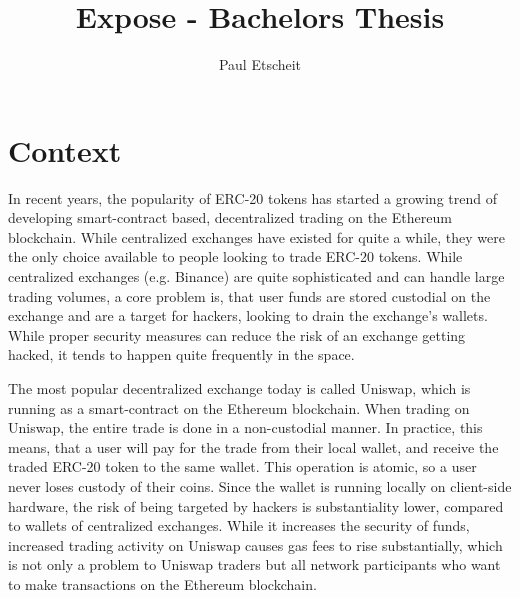 \documentclass[runningheads]{llncs}
\begin{document}
%
\title{Expose - Bachelors Thesis}
%
%
\author{Paul Etscheit}
%
%
%
\maketitle              %

\section{Context}
In recent years, the popularity of ERC-20 tokens has started a growing trend of developing smart-contract based, decentralized trading on the Ethereum blockchain. While centralized exchanges have existed for quite a while, they were the only choice available to people looking to trade ERC-20 tokens. While centralized exchanges (e.g. Binance) are quite sophisticated and can handle large trading volumes, a core problem is, that user funds are stored custodial on the exchange and are a target for hackers, looking to drain the exchange's wallets. While proper security measures can reduce the risk of an exchange getting hacked, it tends to happen quite frequently in the space. 

The most popular decentralized exchange today is called Uniswap\cite{adams2020uniswap}, which is running as a smart-contract on the Ethereum blockchain. When trading on Uniswap, the entire trade is done in a non-custodial manner. In practice, this means, that a user will pay for the trade from their local wallet, and receive the traded ERC-20 token to the same wallet. This operation is atomic, so a user never loses custody of their coins. Since the wallet is running locally on client-side hardware, the risk of being targeted by hackers is substantiality lower, compared to wallets of centralized exchanges. While it increases the security of funds, increased trading activity on Uniswap causes gas fees to rise substantially, which is not only a problem to Uniswap traders but all network participants who want to make transactions on the Ethereum blockchain.
\end{document}

